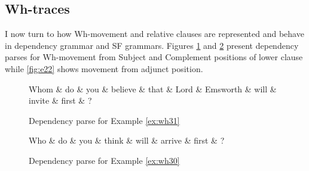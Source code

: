\subsection{Wh-traces}
\label{sec:wh-traces}
    I now turn to how Wh-movement and relative clauses are represented and behave in dependency grammar and SF grammars. Figures \ref{fig:e18} and \ref{fig:e19} present dependency parses for Wh-movement from Subject and Complement positions of lower clause while \ref{fig:e22} shows movement from adjunct position.

    \begin{figure}[!ht]
    	\centering
    	\begin{dependency}
    		\begin{deptext}[]
    			Whom \& do \& you \& believe \& that \& Lord \& Emsworth \& will \& invite \& first \& ?\\
    		\end{deptext}
    	\end{dependency}
    	\caption{Dependency parse for Example \ref{ex:wh31}}
    	\label{fig:e18}
    \end{figure}
    
    \begin{figure}[!ht]
    	\centering
    	\begin{dependency}
    		\begin{deptext}[]
    			Who \& do \& you \& think \& will \& arrive \& first \& ?\\
    		\end{deptext}
    	\end{dependency}
    	\caption{Dependency parse for Example \ref{ex:wh30}}
    	\label{fig:e19}
    \end{figure}
    

